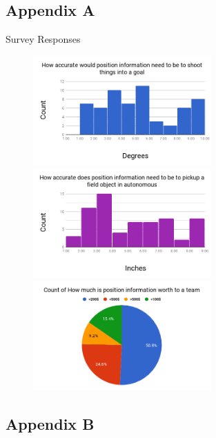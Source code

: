 \documentclass{article}
\begin{document}
  \subsection{Appendix A}\label{appendix:survey}

    Survey Responses

    \begin{figure}[H]
      \centering
      \includegraphics[height=4.2cm]{./images/survey_angle.png}
      \includegraphics[height=4.2cm]{./images/survey_position.png}
      \includegraphics[height=4.2cm]{./images/survey_worth.png}
      \label{fig:survey_imgs}
    \end{figure}

  \subsection{Appendix B}\label{appendix:rf-rx-tx}
\end{document}
